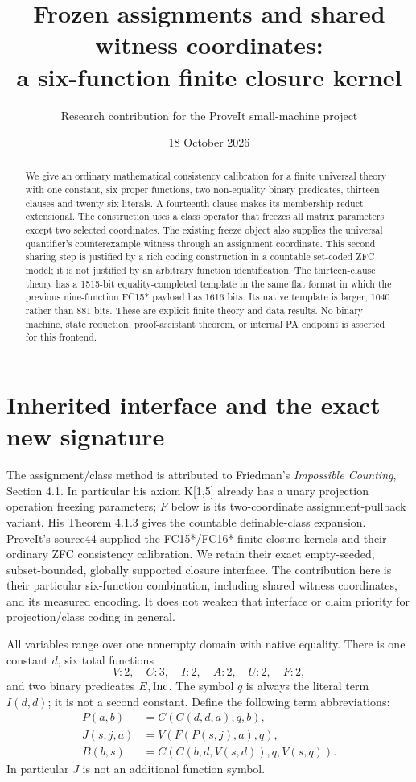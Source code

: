 \documentclass[11pt]{article}
\title{Frozen assignments and shared witness coordinates:\\a six-function finite closure kernel}
\author{Research contribution for the ProveIt small-machine project}
\date{18 October 2026}
\newcommand{\Inc}{\mathop{\rm Inc}}
\begin{document}
\maketitle
\begin{abstract}
We give an ordinary mathematical consistency calibration for a finite
universal theory with one constant, six proper functions, two non-equality
binary predicates, thirteen clauses and twenty-six literals.  A fourteenth
clause makes its membership reduct extensional.  The construction uses a
class operator that freezes all matrix parameters except two selected
coordinates.  The existing freeze object also supplies the universal
quantifier's counterexample witness through an assignment coordinate.
This second sharing step is justified by a rich coding construction in a
countable set-coded ZFC model; it is not justified by an arbitrary function
identification.  The thirteen-clause theory has a 1515-bit equality-completed
template in the same flat format in which the previous nine-function FC15*
payload has 1616 bits.  Its native template is larger, 1040 rather than
881 bits.  These are explicit finite-theory and data results.  No binary
machine, state reduction, proof-assistant theorem, or internal PA endpoint
is asserted for this frontend.
\end{abstract}

\section{Inherited interface and the exact new signature}

The assignment/class method is attributed to Friedman's \emph{Impossible
Counting}, Section 4.1.  In particular his axiom K[1,5] already has a unary
projection operation freezing parameters; $F$ below is its two-coordinate
assignment-pullback variant.  His Theorem 4.1.3 gives the countable
definable-class expansion.  ProveIt's source44 supplied the FC15*/FC16* finite
closure kernels and their ordinary ZFC consistency calibration.  We retain
their exact empty-seeded, subset-bounded, globally supported closure
interface.  The contribution here is their particular six-function
combination, including shared witness coordinates, and its measured
encoding.  It does not weaken that interface or claim priority for
projection/class coding in general.

All variables range over one nonempty domain with native equality.  There
is one constant $d$, six total functions
\[
 V:2,\quad C:3,\quad I:2,\quad A:2,\quad U:2,\quad F:2,
\]
and two binary predicates $E,\Inc$.  The symbol $q$ is always the literal
term $I(d,d)$; it is not a second constant.  Define the following term
abbreviations:
\begin{align*}
 P(a,b)&=C(C(d,d,a),q,b),\\
 J(s,j,a)&=V(F(P(s,j),a),q),\\
 B(b,s)&=C(C(b,d,V(s,d)),q,V(s,q)).
\end{align*}
In particular $J$ is not an additional function symbol.
\end{document}
